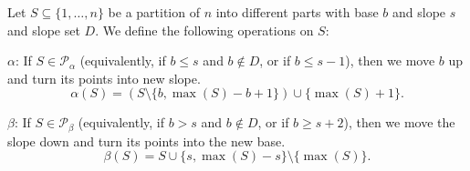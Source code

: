 \begin{definition} 
Let $S \subseteq \{1, \ldots, n\}$ be a partition of $n$ into different parts with base $b$ and slope $s$ and slope set $D$. We define the following operations on $S$:

$\alpha$: If $S\in \mathcal{P_\alpha}$  (equivalently, if $b \leq s$ and $b \notin D$, or if $b \leq s - 1$), then we move $b$ up and turn its points into new slope.
\begin{equation*}
    \alpha(S) = (S \setminus \{b, \max(S) - b + 1\}) \cup \{\max(S)+1\}.
\end{equation*}

$\beta$: If  $S\in \mathcal{P_\beta}$ (equivalently, if $b > s$ and $b \notin D$, or if $b \geq s + 2$), then we move the slope down and turn its points into the new base.
\begin{equation*}
    \beta(S) = S \cup \{s, \max(S)-s\} \setminus \{\max(S)\}.
\end{equation*}
\end{definition}

